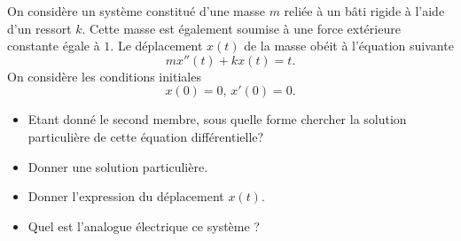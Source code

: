 \bexo
On considère un système constitué d'une masse $m$ reliée à un bâti rigide à l'aide d'un ressort $k$. Cette masse est également soumise à une force extérieure constante égale à $1$. Le déplacement $x(t)$ de la masse obéit à l'équation suivante
\begin{equation}
	mx''(t)+kx(t)=t.
\end{equation}
On considère les conditions initiales 
\begin{equation}
	x(0)=0,\, x'(0)=0.
\end{equation}
\begin{itemize}
	\item Etant donné le second membre, sous quelle forme chercher la solution particulière de cette équation différentielle? 
	\item Donner une solution particulière.
	\item Donner l'expression du déplacement $x(t)$.
	\item Quel est l'analogue électrique ce système ?
\end{itemize}



\eexo
